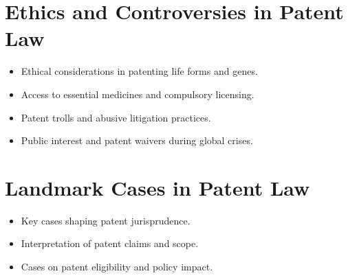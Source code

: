 \section{Ethics and Controversies in Patent Law}
\begin{itemize}
    \item Ethical considerations in patenting life forms and genes.
    \item Access to essential medicines and compulsory licensing.
    \item Patent trolls and abusive litigation practices.
    \item Public interest and patent waivers during global crises.
\end{itemize}

\section{Landmark Cases in Patent Law}
\begin{itemize}
    \item Key cases shaping patent jurisprudence.
    \item Interpretation of patent claims and scope.
    \item Cases on patent eligibility and policy impact.
\end{itemize}

